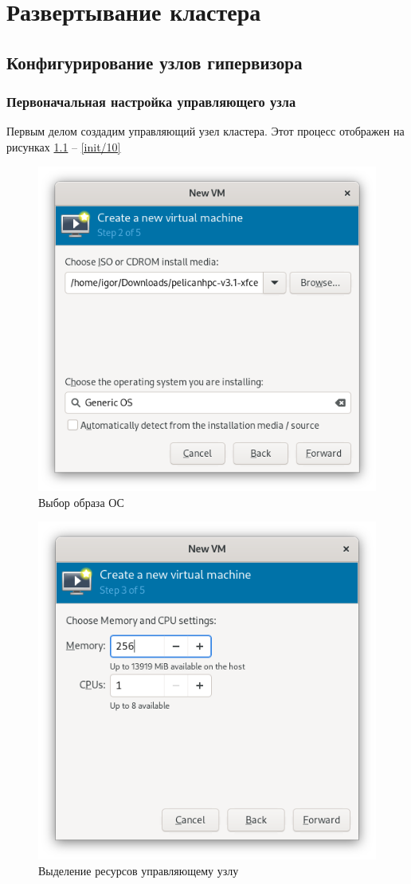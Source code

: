 \chapter{Развертывание кластера}

\section{Конфигурирование узлов гипервизора}

\subsection{Первоначальная настройка управляющего узла}

Первым делом создадим управляющий узел кластера. Этот процесс отображен на рисунках \ref{init/01} -- \ref{init/10}

\begin{figure}[H]
	\centering
	\includegraphics[width=0.5\linewidth]{1-01}
	\caption{Выбор образа ОС}
	\label{init/01}
\end{figure}

\begin{figure}[H]
	\centering
	\includegraphics[width=0.5\linewidth]{1-02}
	\caption{Выделение ресурсов управляющему узлу}
	\label{init/02}
\end{figure}

